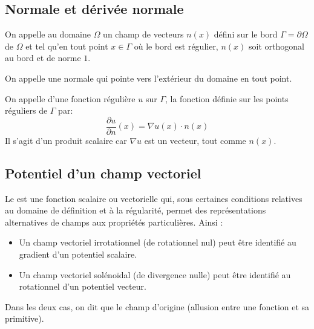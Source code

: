 \ifVersionDuDocEstVincent\medskip\fi
\subsection{Normale et dérivée normale}

\begin{definition}[Normale]
On appelle  au domaine $\Omega$ un champ de vecteurs
$n(x)$ défini sur le bord $\Gamma=\partial\Omega$ de $\Omega$ et tel qu'en tout point
$x\in\Gamma$ où le bord est régulier, $n(x)$ soit orthogonal au bord
et de norme $1$.
\end{definition}

\ifVersionDuDocEstVincent\medskip\fi
On appelle  une normale qui pointe vers
l'extérieur du domaine en tout point.

\ifVersionDuDocEstVincent\medskip\fi
\begin{definition}
On appelle  d'une fonction régulière $u$
sur $\Gamma$, la fonction définie sur les points réguliers de $\Gamma$ par:
\begin{equation}\dfrac{\partial u}{\partial n}(x)=\nabla u(x)\cdot n(x)\end{equation} Il s'agit d'un produit
scalaire car $\nabla u$ est un vecteur, tout comme $n(x)$.
\end{definition}

\ifVersionDuDocEstVincent\medskip\fi
\subsection{Potentiel d'un champ vectoriel}

Le  est une fonction scalaire ou vectorielle qui,
sous certaines conditions relatives au domaine de définition et à la régularité,
permet des représentations alternatives de champs aux propriétés particulières.
Ainsi :
\begin{itemize}
   \item Un champ vectoriel irrotationnel (de rotationnel nul) peut être identifié au gradient d'un potentiel scalaire.
   \item Un champ vectoriel solénoïdal (de divergence nulle) peut être identifié au rotationnel d'un potentiel vecteur.
\end{itemize}
Dans les deux cas, on dit que le champ d'origine 
(allusion entre une fonction et sa primitive).

